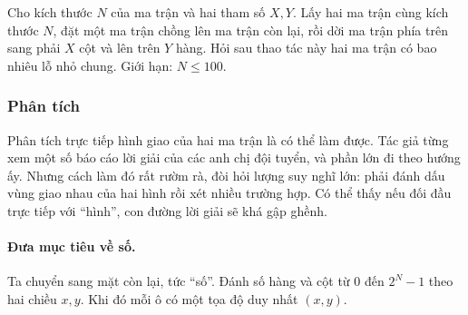 \documentclass[11pt]{article}
\begin{document}
\begin{center}
\end{center}

Cho kích thước $N$ của ma trận và hai tham số $X,Y$. Lấy hai ma trận cùng
kích thước $N$, đặt một ma trận chồng lên ma trận còn lại, rồi dời ma trận
phía trên sang phải $X$ cột và lên trên $Y$ hàng. Hỏi sau thao tác này hai
ma trận có bao nhiêu lỗ nhỏ chung. Giới hạn: $N\le 100$.

\subsubsection*{Phân tích}

Phân tích trực tiếp hình giao của hai ma trận là có thể làm được. Tác giả
từng xem một số báo cáo lời giải của các anh chị đội tuyển, và phần lớn đi
theo hướng ấy. Nhưng cách làm đó rất rườm rà, đòi hỏi lượng suy nghĩ lớn:
phải đánh dấu vùng giao nhau của hai hình rồi xét nhiều trường hợp. Có thể
thấy nếu đối đầu trực tiếp với ``hình'', con đường lời giải sẽ khá gập ghềnh.

\paragraph{Đưa mục tiêu về số.}
Ta chuyển sang mặt còn lại, tức ``số''. Đánh số hàng và cột từ $0$ đến
$2^N-1$ theo hai chiều $x,y$. Khi đó mỗi ô có một tọa độ duy nhất $(x,y)$.
\end{document}
